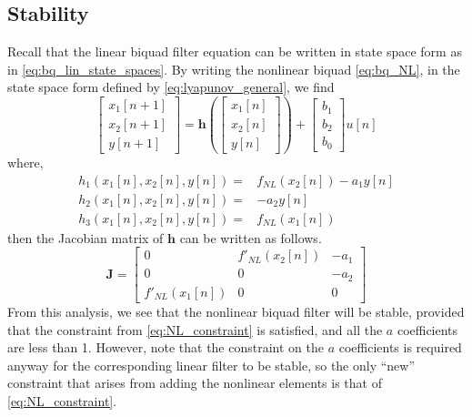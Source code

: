 \documentclass[twoside,a4paper]{article}
\begin{document}
\subsection{Stability}
%
Recall that the linear biquad filter equation can be written
in state space form as in \cref{eq:bq_lin_state_spaces}. By
writing the nonlinear biquad \cref{eq:bq_NL}, in the state space
form defined by \cref{eq:lyapunov_general}, we find
%
\begin{equation}
    \begin{bmatrix} x_1[n+1] \\ x_2[n+1] \\ y[n+1] \end{bmatrix} =
    \mathbf{h} \left( \begin{bmatrix} x_1[n] \\ x_2[n] \\ y[n] \end{bmatrix}
    \right) + \begin{bmatrix} b_1\\ b_2\\ b_0 \end{bmatrix} u[n]
    \label{eq:nlbq_states}
\end{equation}
%
where,
%
\begin{equation}
    \begin{split}
        h_1(x_1[n], x_2[n], y[n]) =& f_{NL}(x_2[n]) - a_1y[n] \\
        h_2(x_1[n], x_2[n], y[n]) =& -a_2y[n] \\
        h_3(x_1[n], x_2[n], y[n]) =& f_{NL}(x_1[n])
    \end{split}
    \label{eq:nlbq_state_eqns}
\end{equation}
%
then the Jacobian matrix of $\mathbf{h}$ can be written as follows.
%
\begin{equation}
    \mathbf{J} = \begin{bmatrix}
        0& f'_{NL}(x_2[n])& -a_1 \\
        0& 0& -a_2 \\
        f'_{NL}(x_1[n])& 0& 0
    \end{bmatrix}
    \label{eq:nlbq_Jacobian}
\end{equation}
%
From this analysis, we see that the nonlinear biquad filter will be
stable, provided that the constraint from \cref{eq:NL_constraint}
is satisfied, and all the $a$ coefficients are less than 1. However,
note that the constraint on the $a$ coefficients is required
anyway for the corresponding linear filter to be stable, so the
only ``new'' constraint that arises from adding the nonlinear
elements is that of \cref{eq:NL_constraint}.
\end{document}
